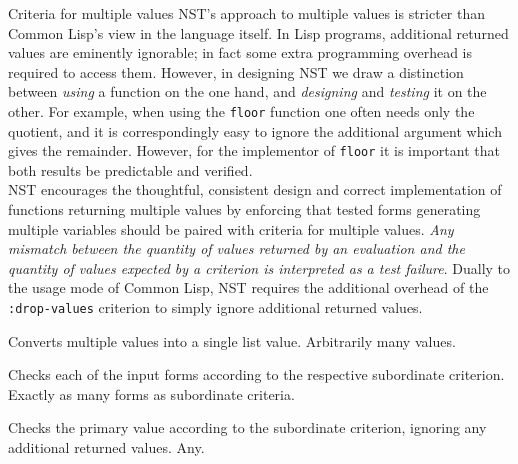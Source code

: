 \begin{criteriaGroup}{Criteria for multiple values}{
NST's approach to multiple values is stricter than Common Lisp's view
in the language itself.  In Lisp programs, additional returned values
are eminently ignorable; in fact some extra programming overhead is
required to access them.  However, in designing NST we draw a
distinction between \emph{using} a function on the one hand, and
\emph{designing} and \emph{testing} it on the other.  For example,
when using the \texttt{floor} function one often needs only the
quotient, and it is correspondingly easy to ignore the additional
argument which gives the remainder.  However, for the implementor of
\texttt{floor} it is important that both results be predictable and
verified.\vspace{\parskip}\\\hspace*{\parindent}NST encourages the
thoughtful, consistent design and correct implementation of functions
returning multiple values by enforcing that tested forms generating
multiple variables should be paired with criteria for multiple values.
\emph{Any mismatch between the quantity of values returned by an
  evaluation and the quantity of values expected by a criterion is
  interpreted as a test failure}.  Dually to the usage mode of Common
Lisp, NST requires the additional overhead of the
\texttt{:drop-values} criterion to simply ignore additional returned
values.}

{Converts multiple values into a single list value.}
{Arbitrarily many values.}
{\noExpl}{\noEx}{}

{Checks each of the input forms according to the respective
subordinate criterion.}
{Exactly as many forms as subordinate criteria.}
{\noExpl}{\noEx}{}

{Checks the primary value according to the subordinate criterion,
ignoring any additional returned values.}
{Any.}
{\noExpl}{\noEx}{}

\end{criteriaGroup}

